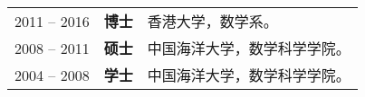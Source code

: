 %
%


\begin{tabular}{rll}	
	2011 -- 2016  &  \textbf{博士} &香港大学，数学系。\\
	2008 -- 2011  &  \textbf{硕士} &中国海洋大学，数学科学学院。\\
	2004 -- 2008  &  \textbf{学士} &中国海洋大学，数学科学学院。
\end{tabular}